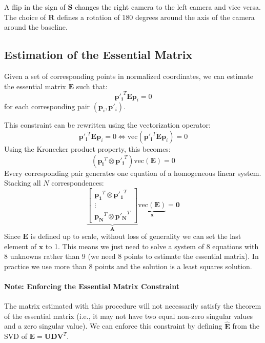 \documentclass[11pt,a4paper]{article}
\theoremstyle{definition}
\theoremstyle{plain}
\theoremstyle{remark}
\begin{document}
A flip in the sign of $\mathbf{S}$ changes the right camera to the left camera and vice versa.
The choice of $\mathbf{R}$ defines a rotation of 180 degrees around the axis of the camera around the baseline.

\subsection{Estimation of the Essential Matrix}
Given a set of corresponding points in normalized coordinates, we can estimate the essential matrix
$\mathbf{E}$ such that:
\begin{equation} \label{eq:epipolar_constraint_points}
    \mathbf{{p}'_i}^T \mathbf{E} \mathbf{p}_i = 0
\end{equation}
for each corresponding pair $(\mathbf{p}_i, \mathbf{p}'_i)$.

This constraint can be rewritten using the vectorization operator:
\begin{equation} \nonumber
    \mathbf{{p}'_i}^T \mathbf{E} \mathbf{p}_i = 0 \Leftrightarrow \text{vec}(\mathbf{{p}'_i}^T \mathbf{E} \mathbf{p}_i) = 0
\end{equation}
Using the Kronecker product property, this becomes:
\begin{equation} \nonumber
    (\mathbf{{p}_i}^T \otimes \mathbf{{p}'_i}^T) \text{vec}(\mathbf{E}) = 0
\end{equation}
Every corresponding pair generates one equation of a homogeneous linear system. Stacking all $N$ correspondences:
\begin{equation} \label{eq:essential_linear_system}
    \underbrace{
    \begin{bmatrix}
    \mathbf{{p}_1}^T \otimes \mathbf{{p}'_1}^T \\
    \vdots \\
    \mathbf{{p}_N}^T \otimes \mathbf{{p}'_N}^T
    \end{bmatrix}
    }_{\mathbf{A}}
    \underbrace{\text{vec}(\mathbf{E})}_{\mathbf{x}} = \mathbf{0}
\end{equation}
Since $\mathbf{E}$ is defined up to scale, without loss of generality we can set the last element of $\mathbf{x}$ to 1.
This means we just need to solve a system of 8 equations with 8 unknowns rather than 9 
(we need 8 points to estimate the essential matrix). In practice we use more than 8 points
and the solution is a least squares solution.

\paragraph{Note: Enforcing the Essential Matrix Constraint}
The matrix estimated with this procedure will not necessarily satisfy the theorem of the essential matrix (i.e., it may not have two equal non-zero singular values and a zero singular value).
We can enforce this constraint by defining $\hat{\mathbf{E}}$ from the SVD of $\mathbf{E} = \mathbf{U} \mathbf{D} \mathbf{V}^T$.
\end{document}
